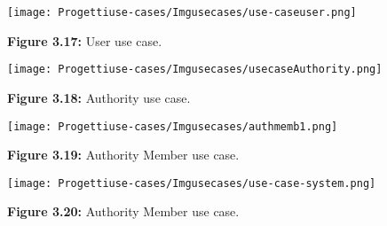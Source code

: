 \documentclass[12pt]{article}
\begin{document}
\begin{center}
\texttt{[image: Progettiuse-cases/Imgusecases/use-caseuser.png]}                 

\textbf{Figure 3.17:} User use case. 
\end{center}

\newpage
\vspace{5mm}
\begin{center}
\texttt{[image: Progettiuse-cases/Imgusecases/usecaseAuthority.png]}                 

\textbf{Figure 3.18:} Authority use case. 
\end{center}

\begin{center}
\texttt{[image: Progettiuse-cases/Imgusecases/authmemb1.png]}                 

\textbf{Figure 3.19:} Authority Member use case. 
\end{center}

\begin{center}
\texttt{[image: Progettiuse-cases/Imgusecases/use-case-system.png]}                  

\textbf{Figure 3.20:} Authority Member use case. 
\end{center}

\newpage

\end{document}
